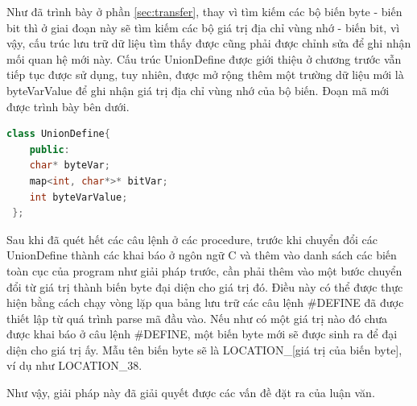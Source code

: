 Như đã trình bày ở phần \ref{sec:transfer}, thay vì tìm kiếm các bộ biến byte - biến bit thì ở giai đoạn này sẽ tìm kiếm các bộ giá trị địa chỉ vùng nhớ - biến bit, vì vậy, cấu trúc lưu trữ dữ liệu tìm thấy được cũng phải được chỉnh sửa để ghi nhận mối quan hệ mới này. Cấu trúc UnionDefine được giới thiệu ở chương trước vẫn tiếp tục được sử dụng, tuy nhiên, được mở rộng thêm một trường dữ liệu mới là byteVarValue để ghi nhận giá trị địa chỉ vùng nhớ của bộ biến. Đoạn mã mới được trình bày bên dưới.

\begin{lstlisting}[caption={Đoạn mã mới của class UnionDefine},label={list:listnewuniondefine},language=c++]
	class UnionDefine{
	public:
	char* byteVar;
	map<int, char*>* bitVar;
	int byteVarValue;
 };
\end{lstlisting}
Sau khi đã quét hết các câu lệnh ở các procedure, trước khi chuyển đổi các UnionDefine thành các khai báo ở ngôn ngữ C và thêm vào danh sách các biến toàn cục của program như giải pháp trước, cần phải thêm vào một bước chuyển đổi từ giá trị thành biến byte đại diện cho giá trị đó. Điều này có thể được thực hiện bằng cách chạy vòng lặp qua bảng lưu trữ các câu lệnh \#DEFINE đã được thiết lập từ quá trình parse mã đầu vào. Nếu như có một giá trị nào đó chưa được khai báo ở câu lệnh \#DEFINE, một biến byte mới sẽ được sinh ra để đại diện cho giá trị ấy. Mẫu tên biến byte sẽ là LOCATION\_[giá trị của biến byte], ví dụ như LOCATION\_38.

Như vậy, giải pháp này đã giải quyết được các vấn đề đặt ra của luận văn. 
